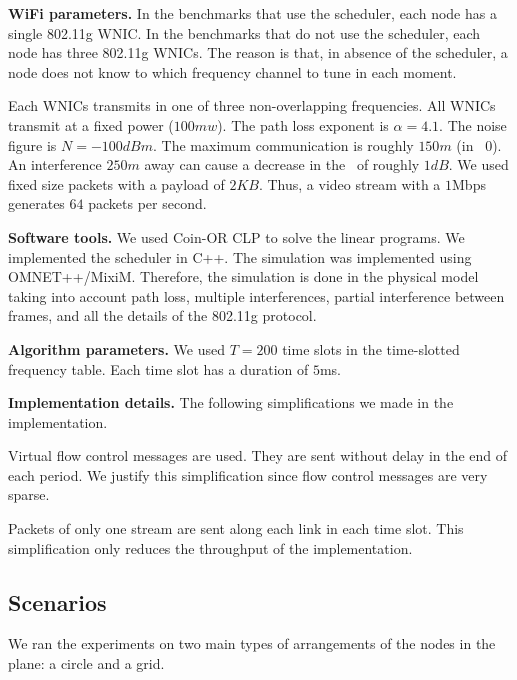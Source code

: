 \documentclass[12pt]{article}
\newenvironment{proof sketch}[1]{\noindent {\emph{Proof sketch of #1:}}}{\hfill \qed}
\newcommand{\SINR}{\text{\sc{sinr}}}
\newcommand{\MCS}{\text{\sc{mcs}}}
\begin{document}
\noindent
\textbf{WiFi parameters.}  In the benchmarks that use the scheduler,
each node has a single 802.11g WNIC.  In the benchmarks that do not
use the scheduler, each node has three 802.11g WNICs.  The reason is
that, in absence of the scheduler, a node does not know to which
frequency channel to tune in each moment.

 Each WNICs transmits in one of three
non-overlapping frequencies.  All WNICs transmit at a fixed power
($100mw$). The path loss exponent is $\alpha=4.1$. The noise figure
is $N=-100dBm$. The maximum communication is roughly $150m$ (in \MCS\
$0$). An interference $250m$ away can cause a decrease in the \SINR\
of roughly $1dB$. We used fixed size packets with a payload of $2KB$.
Thus, a video stream with a $1$Mbps generates $64$ packets per second.



\noindent\textbf{Software tools.}  We used Coin-OR CLP to solve the linear
programs.  We implemented the scheduler in C++.  The simulation was
implemented using OMNET++/MixiM. Therefore, the simulation is done in
the physical model taking into account path loss, multiple
interferences, partial interference between frames, and all the
details of the 802.11g protocol.

\noindent\textbf{Algorithm parameters.} We used $T=200$ time slots in the
time-slotted frequency table.  Each time slot has a duration of $5$ms.

\noindent\textbf{Implementation details.}
The following simplifications we made in the implementation.
\begin{inparaenum}[(1)]
\item Virtual flow control messages are used. They are sent without
  delay in the end of each period. We justify this simplification
  since flow control messages are very sparse.
\item Packets of only one stream are sent along each link in each time slot.
This simplification only reduces the throughput of the implementation.
\end{inparaenum}

\subsection{Scenarios}
We ran the experiments on two main types of arrangements of the nodes
in the plane: a circle and a grid.
\end{document}
